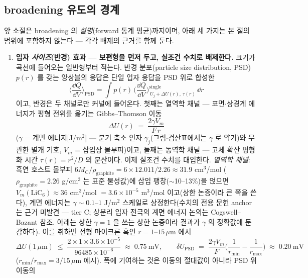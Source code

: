 \subsection{broadening 유도의 경계}\label{sec:broadening-scope}
앞 소절은 broadening 의 \emph{설명}(forward 통계
평균)까지이며, 아래 세 가지는 본 절의 범위에 포함하지 않는다 --- 각각 배제의 근거를 함께 둔다.
\begin{enumerate}[label=(\roman*),leftmargin=2.2em,itemsep=2.5pt]
\item \textbf{입자 \emph{사이즈}(반경) 효과 --- 보편형을 먼저 두고, 실조건 수치로 배제한다.} 크기가 곡선에
들어오는 일반형부터 적는다. 반경 분포(particle size distribution, PSD) $p(r)$ 를 갖는 앙상블의 응답은
단일 입자 응답을 PSD 위로 합성한
\begin{equation}
\Big\langle\frac{\dd Q}{\dd V}\Big\rangle_\mathrm{PSD}
=\int p(r)\,\Big(\frac{\dd Q}{\dd V}\Big)^{\mathrm{single}}_{\,U_j+\Delta U(r),\ \tau(r)}\,\dd r
\label{eq:psdconv}
\end{equation}
이고, 반경은 두 채널로만 커널에 들어온다. 첫째는 열역학 채널 --- 표면$\cdot$상경계 에너지가 평형 전위를
옮기는 Gibbs--Thomson 이동
\begin{equation}
\Delta U(r)\;=\;\frac{2\gamma V_m}{F\,r}
\label{eq:gibbsthomson}
\end{equation}
($\gamma$ = 계면 에너지[J/m$^2$] --- 분기 축소 인자 $\gamma_j$(그림$\cdot$검산표에서는 $\gamma$ 로
약기)와 무관한 별개 기호, $V_m$ = 삽입상
몰부피)이고, 둘째는 동역학 채널 --- 고체 확산 평형화 시간
$\tau(r)=r^2/D$ 의 분산이다. 이제 실조건 수치를 대입한다. \emph{열역학 채널}: 흑연 호스트 몰부피
$6M_\mathrm{C}/\rho_\mathrm{graphite}=6\times12.011/2.26\approx31.9$ cm$^3$/mol
($\rho_\mathrm{graphite}=2.26$ g/cm$^3$ 는 표준 물성값)에 삽입 팽창($\sim$10--13\%)을 얹으면
$V_m(\mathrm{LiC_6})\approx36$ cm$^3$/mol $=3.6\times10^{-5}$ m$^3$/mol 이고(상한 논증이라 큰 쪽을 쓴다),
계면 에너지는 $\gamma\sim0.1$--$1$ J/m$^2$ 스케일로 상정한다(수치의 전용 문헌 anchor 는 근거 미발견 ---
tier C; 상분리 입자 전극의 계면 에너지 논의는 Cogswell--Bazant\cite{cogswell2012} 참조. 아래는 상한
$\gamma=1$ 을 쓰는 상한 논증이라 결과가 $\gamma$ 의 정확값에 둔감하다). 이를 취하면
전형 마이크론 흑연 $r=1$--$15\,\mu$m 에서
\[
\Delta U(1\,\mu\mathrm m)\;\le\;\frac{2\times1\times3.6\times10^{-5}}{96485\times10^{-6}}
\;\approx\;0.75\ \mathrm{mV},
\qquad
\delta U_\mathrm{PSD}\;=\;\frac{2\gamma V_m}{F}\Big(\frac{1}{r_{\min}}-\frac{1}{r_{\max}}\Big)
\;\approx\;0.20\ \mathrm{mV}
\]
($r_{\min}/r_{\max}=3/15\,\mu$m 예시). 폭에 기여하는 것은 이동의 절대값이 아니라 PSD 위 이동의

\end{enumerate}
